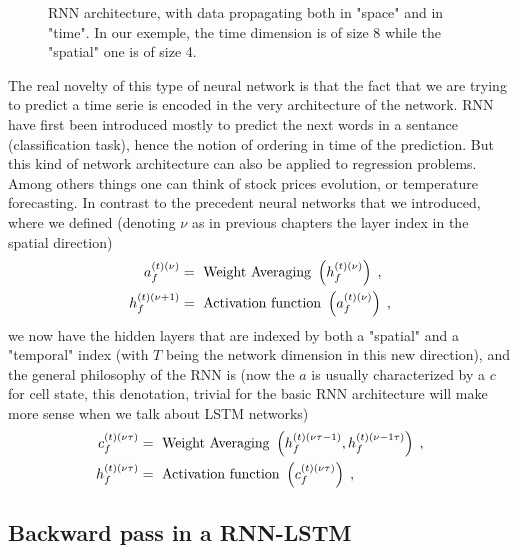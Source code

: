 \begin{figure}[H]
\begin{center}
\caption{\label{fig:RNN architecture}RNN architecture, with data propagating both in "space" and in "time". In our exemple, the time dimension is of size 8 while the "spatial" one is of size 4.}
\end{center}
\end{figure}

The real novelty of this type of neural network is that the fact that we are trying to predict a time serie is encoded in the very architecture of the network. RNN have first been introduced mostly to predict the next words in a sentance (classification task), hence the notion of ordering in time of the prediction. But this kind of network architecture can also be applied to regression problems. Among others things one can think of stock prices evolution, or temperature forecasting. In contrast to the precedent neural networks that we introduced, where we defined (denoting $\nu$ as in previous chapters the layer index in the spatial direction)
\begin{align}
a^{(t)(\nu)}_{f}&= \text{ Weight Averaging } \left(h^{(t)(\nu)}_{f}\right)\;,\notag\\
%
h^{(t)(\nu+1)}_{f}&= \text{ Activation function } \left(a^{(t)(\nu)}_{f}\right)\;,
\end{align}
we now have the hidden layers that are indexed by both a "spatial" and a "temporal" index (with $T$ being the network dimension in this new direction), and the general philosophy of the RNN is (now the $a$ is usually characterized by a $c$ for cell state, this denotation, trivial for the basic RNN architecture will make more sense when we talk about LSTM networks)
\begin{align}
c^{(t)(\nu \tau )}_{f}&= \text{ Weight Averaging } \left(h^{(t)(\nu \tau-1)}_{f},h^{(t)(\nu-1\tau)}_{f}\right)\;,\notag\\
%
h^{(t)(\nu\tau)}_{f}&= \text{ Activation function } \left(c^{(t)(\nu \tau)}_{f}\right)\;,
\end{align}

\subsection{Backward pass in a RNN-LSTM}

